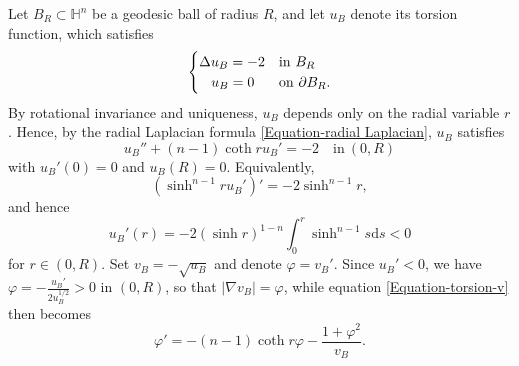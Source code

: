 \documentclass[11pt]{amsart}
\newcommand{\dd}{\mathrm{d}}
\numberwithin{theorem}{section}
\numberwithin{equation}{section}
\begin{document}
Let $B_R\subset\mathbb{H}^n$ be a geodesic ball of radius $R$, and let $u_B$ denote its torsion function, which satisfies $$\begin{cases}
\Delta u_B=-2 & \mathrm{in}\ B_R\\
\hspace{0.3cm} u_B=0 & \mathrm{on}\ \partial B_R.
\end{cases}$$ By rotational invariance and uniqueness, $u_B$ depends only on the radial variable $r$. Hence, by the radial Laplacian formula \eqref{Equation-radial Laplacian}, $u_B$ satisfies
\begin{equation}\label{Equation-torsion-radial-u}
u_B''+(n-1)\coth ru_B'=-2\quad\mathrm{in}\ (0,R)
\end{equation}
with $u_B'(0)=0$ and $u_B(R)=0.$ Equivalently, $$(\sinh^{n-1}ru_B')'=-2\sinh^{n-1}r,$$ and hence $$u_B'(r)=-2(\sinh r)^{1-n}\int_0^r\sinh^{n-1}s\dd s<0$$ for $r\in(0,R)$. Set $v_B=-\sqrt{u_B}$ and denote $\varphi=v_B'$. Since $u_B'<0$, we have $\varphi=-\frac{u_B'}{2u_B^{1/2}}>0$ in $(0,R)$, so that $|\nabla v_B|=\varphi$, while equation \eqref{Equation-torsion-v} then becomes
\begin{equation}\label{Equation-torsion-radial}
\varphi'=-(n-1)\coth r\varphi-\frac{1+\varphi^2}{v_B}.
\end{equation}
\end{document}
